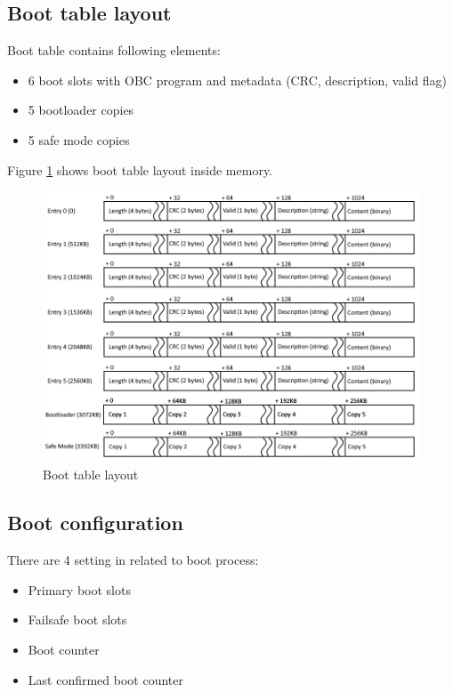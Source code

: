 \subsection{Boot table layout}
Boot table contains following elements:
\begin{itemize}
	\item 6 boot slots with OBC program and metadata (CRC, description, valid flag)
	\item 5 bootloader copies
	\item 5 safe mode copies
\end{itemize}

Figure \ref{fig:func:boottable} shows boot table layout inside memory.

\begin{figure}
	\label{fig:func:boottable}
	\includegraphics[width=20cm,angle=90]{img/boot-table.png}
	\caption{Boot table layout}
\end{figure}

\subsection{Boot configuration}
There are 4 setting in  related to boot process:
\begin{itemize}
	\item Primary boot slots
	\item Failsafe boot slots
	\item Boot counter
	\item Last confirmed boot counter
\end{itemize}

